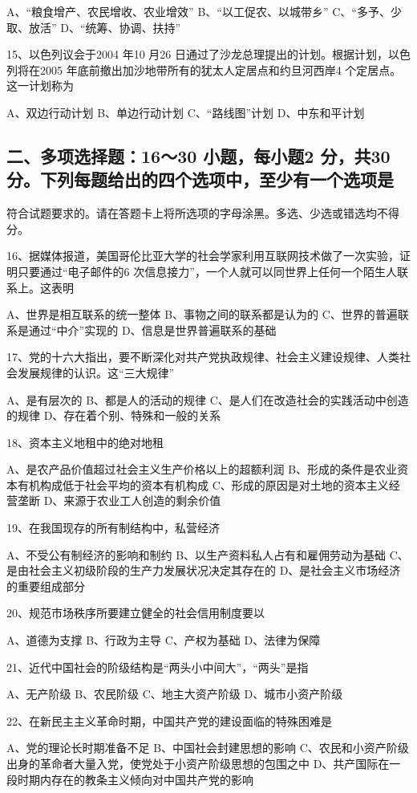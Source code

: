 \documentclass[UTF8,11pt]{ctexart}
\begin{document}
A、“粮食增产、农民增收、农业增效” B、“以工促农、以城带乡” C、“多予、少取、放活” D、“统筹、协调、扶持”


15、以色列议会于2004 年10 月26 日通过了沙龙总理提出的计划。根据计划，以色列将在2005 年底前撤出加沙地带所有的犹太人定居点和约旦河西岸4 个定居点。这一计划称为


A、双边行动计划 B、单边行动计划 C、“路线图”计划 D、中东和平计划


\subsection*{二、多项选择题：16～30 小题，每小题2 分，共30 分。下列每题给出的四个选项中，至少有一个选项是}

符合试题要求的。请在答题卡上将所选项的字母涂黑。多选、少选或错选均不得分。


16、据媒体报道，美国哥伦比亚大学的社会学家利用互联网技术做了一次实验，证明只要通过“电子邮件的6 次信息接力”，一个人就可以同世界上任何一个陌生人联系上。这表明


A、世界是相互联系的统一整体 B、事物之间的联系都是认为的 C、世界的普遍联系是通过“中介”实现的 D、信息是世界普遍联系的基础


17、党的十六大指出，要不断深化对共产党执政规律、社会主义建设规律、人类社会发展规律的认识。这“三大规律”


A、是有层次的 B、都是人的活动的规律 C、是人们在改造社会的实践活动中创造的规律 D、存在着个别、特殊和一般的关系


18、资本主义地租中的绝对地租


A、是农产品价值超过社会主义生产价格以上的超额利润 B、形成的条件是农业资本有机构成低于社会平均的资本有机构成 C、形成的原因是对土地的资本主义经营垄断 D、来源于农业工人创造的剩余价值


19、在我国现存的所有制结构中，私营经济


A、不受公有制经济的影响和制约 B、以生产资料私人占有和雇佣劳动为基础 C、是由社会主义初级阶段的生产力发展状况决定其存在的 D、是社会主义市场经济的重要组成部分


20、规范市场秩序所要建立健全的社会信用制度要以


A、道德为支撑 B、行政为主导 C、产权为基础 D、法律为保障


21、近代中国社会的阶级结构是“两头小中间大”，“两头”是指


A、无产阶级 B、农民阶级 C、地主大资产阶级 D、城市小资产阶级


22、在新民主主义革命时期，中国共产党的建设面临的特殊困难是


A、党的理论长时期准备不足 B、中国社会封建思想的影响 C、农民和小资产阶级出身的革命者大量入党，使党处于小资产阶级思想的包围之中 D、共产国际在一段时期内存在的教条主义倾向对中国共产党的影响
\end{document}

